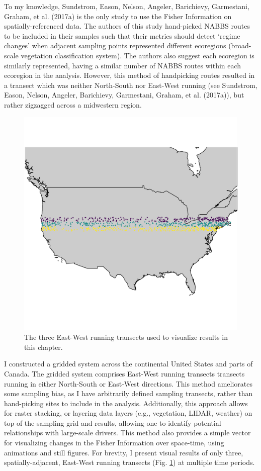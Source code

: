 \documentclass[12pt,twoside,openany]{reedthesis}
\begin{document}
To my knowledge, Sundstrom, Eason, Nelson, Angeler, Barichievy, Garmestani, Graham, et al. (2017a) is the only study to use the Fisher Information on spatially-referenced data. The authors of this study hand-picked NABBS routes to be included in their samples such that their metrics should detect `regime changes' when adjacent sampling points represented different ecoregions (broad-scale vegetation classification system). The authors also suggest each ecoregion is similarly represented, having a similar number of NABBS routes within each ecoregion in the analysis. However, this method of handpicking routes resulted in a transect which was neither North-South nor East-West running (see Sundstrom, Eason, Nelson, Angeler, Barichievy, Garmestani, Graham, et al. (2017a)), but rather zigzagged across a midwestern region.
\begin{figure}[h]

{\centering \includegraphics[width=0.85\linewidth]{./chapterFiles/fisherSpatial/figures/figsCalledInDiss/transectSamplingALlRoutesUsed} 

}

\caption{The three East-West running transects used to visualize results in this chapter.}\label{fig:ewRoutesUsedHere}
\end{figure}
I constructed a gridded system across the continental United States and parts of Canada. The gridded system comprises East-West running transects transects running in either North-South or East-West directions. This method ameliorates some sampling bias, as I have arbitrarily defined sampling transects, rather than hand-picking sites to include in the analysis. Additionally, this approach allows for raster stacking, or layering data layers (e.g., vegetation, LIDAR, weather) on top of the sampling grid and results, allowing one to identify potential relationships with large-scale drivers. This method also provides a simple vector for visualizing changes in the Fisher Information over space-time, using animations and still figures. For brevity, I present visual results of only three, spatially-adjacent, East-West running transects (Fig. \ref{fig:ewRoutesUsedHere}) at multiple time periods.
\end{document}
